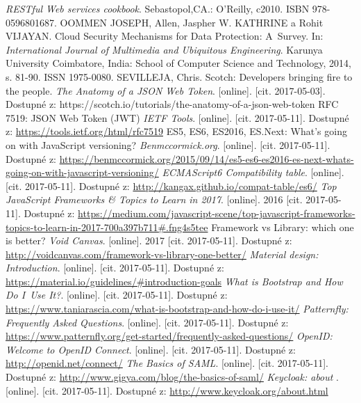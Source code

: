 \begin{thebibliography}{99}
\textit{RESTful Web services cookbook}.
Sebastopol,CA.: O'Reilly, c2010. ISBN 978-0596801687.
OOMMEN JOSEPH, Allen, Jaspher W. KATHRINE a Rohit VIJAYAN.
Cloud Security Mechanisms for Data Protection: A~Survey. In: \textit{International Journal of Multimedia and Ubiquitous Engineering}.
Karunya University Coimbatore, India: School of Computer Science and Technology, 2014, s. 81-90. ISSN 1975-0080.
SEVILLEJA, Chris.
Scotch: Developers bringing fire to the people. \textit{The Anatomy of a JSON Web Token}.
[online]. [cit. 2017-05-03]. Dostupné z: https://scotch.io/tutorials/the-anatomy-of-a-json-web-token
RFC 7519: JSON Web Token (JWT)
\textit{IETF Tools}.
[online]. [cit. 2017-05-11]. Dostupné z: \url{https://tools.ietf.org/html/rfc7519}
ES5, ES6, ES2016, ES.Next: What's going on with JavaScript versioning?
\textit{Benmccormick.org}.
[online]. [cit. 2017-05-11]. Dostupné z: \url{https://benmccormick.org/2015/09/14/es5-es6-es2016-es-next-whats-going-on-with-javascript-versioning/}
\textit{ECMAScript6 Compatibility table}.
[online]. [cit. 2017-05-11]. Dostupné z: \url{http://kangax.github.io/compat-table/es6/}
\textit{Top JavaScript Frameworks \& Topics to Learn in 2017}.
[online]. 2016 [cit. 2017-05-11].  Dostupné z:  \url{https://medium.com/javascript-scene/top-javascript-frameworks-topics-to-learn-in-2017-700a397b711#.fng4s5tee}
Framework vs Library: which one is better?
\textit{Void Canvas}.
[online]. 2017 [cit. 2017-05-11]. Dostupné z: \url{http://voidcanvas.com/framework-vs-library-one-better/}
\textit{Material design: Introduction}.
[online]. [cit. 2017-05-11]. Dostupné z: \url{https://material.io/guidelines/#introduction-goals}
\textit{What is Bootstrap and How Do I~Use It?}.
[online]. [cit. 2017-05-11]. Dostupné z: \url{https://www.taniarascia.com/what-is-bootstrap-and-how-do-i-use-it/}
\textit{Patternfly: Frequently Asked Questions}.
[online]. [cit. 2017-05-11]. Dostupné z: \url{https://www.patternfly.org/get-started/frequently-asked-questions/}
\textit{OpenID: Welcome to OpenID Connect}.
[online]. [cit. 2017-05-11]. Dostupné z: \url{http://openid.net/connect/}
\textit{The Basics of SAML}.
[online]. [cit. 2017-05-11]. Dostupné z: \url{http://www.gigya.com/blog/the-basics-of-saml/}
\textit{Keycloak: about }.
[online]. [cit. 2017-05-11]. Dostupné z: \url{http://www.keycloak.org/about.html}

\end{thebibliography}
